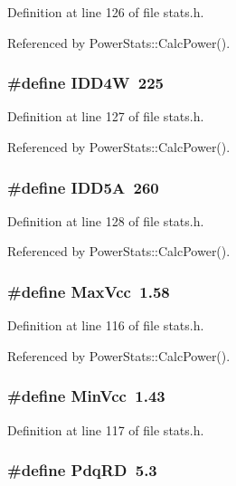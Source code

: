 Definition at line 126 of file stats.h.

Referenced by PowerStats::CalcPower().
\subsubsection[{IDD4W}]{\setlength{\rightskip}{0pt plus 5cm}\#define IDD4W~225}\label{stats_8h_752ac0260f3befd9243fab14a7ff0994}




Definition at line 127 of file stats.h.

Referenced by PowerStats::CalcPower().
\subsubsection[{IDD5A}]{\setlength{\rightskip}{0pt plus 5cm}\#define IDD5A~260}\label{stats_8h_9735936760d8cad777efe3440d06fbdb}




Definition at line 128 of file stats.h.

Referenced by PowerStats::CalcPower().
\subsubsection[{MaxVcc}]{\setlength{\rightskip}{0pt plus 5cm}\#define MaxVcc~1.58}\label{stats_8h_cd4bf9927ff09701b4569aac60226b2c}




Definition at line 116 of file stats.h.

Referenced by PowerStats::CalcPower().
\subsubsection[{MinVcc}]{\setlength{\rightskip}{0pt plus 5cm}\#define MinVcc~1.43}\label{stats_8h_8a1ee7466c26ff3d55d3280a2cba349f}




Definition at line 117 of file stats.h.
\subsubsection[{PdqRD}]{\setlength{\rightskip}{0pt plus 5cm}\#define PdqRD~5.3}\label{stats_8h_01782c77f87acc473332946016bf9896}




